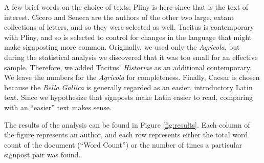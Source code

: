 A few brief words on the choice of texts: Pliny is here since that is the text of interest. Cicero and Seneca are the authors of the other two large, extant collections of letters, and so they were selected as well. Tacitus is contemporary with Pliny, and so is selected to control for changes in the language that might make signposting more common. Originally, we used only the \textit{Agricola}, but during the statistical analysis we discovered that it was too small for an effective sample. Therefore, we added Tacitus' \textit{Historiae} as an additional contemporary. We leave the numbers for the \textit{Agricola} for completeness. Finally, Caesar is chosen because the \textit{Bella Gallica} is generally regarded as an easier, introductory Latin text. Since we hypothesize that signposts make Latin easier to read, comparing with an ``easier'' text makes sense.

The results of the analysis can be found in Figure \ref{fig:results}. Each column of the figure represents an author, and each row represents either the total word count of the document (``Word Count'') or the number of times a particular signpost pair was found.

